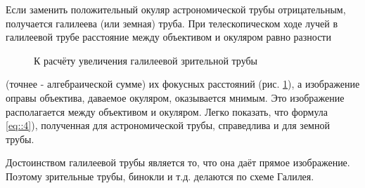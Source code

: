 Если заменить положительный окуляр астрономической трубы отрицательным, получается галилеева 
(или земная) труба. При телескопическом ходе лучей в галилеевой трубе расстояние между объективом 
и окуляром равно разности 

\begin{figure}[h]
  \caption{К расчёту увеличения галилеевой зрительной трубы}
  \label{img::5}
\end{figure}

\noindent (точнее - алгебраической сумме) их фокусных расстояний (рис. \ref{img::5}), а
изображение оправы объектива, даваемое окуляром, оказывается мнимым. Это изображение располагается 
между объективом и окуляром. Легко показать, что формула \eqref{eq::4}), полученная для 
астрономической трубы, справедлива и для земной трубы.

Достоинством галилеевой трубы является то, что она даёт прямое
изображение. Поэтому зрительные трубы, бинокли и т.д. делаются по
схеме Галилея.